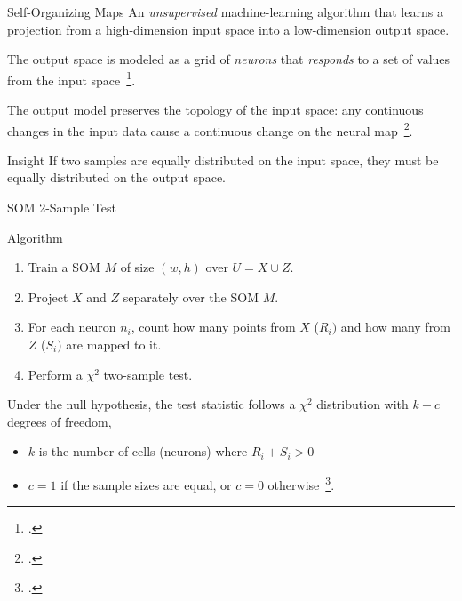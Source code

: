 \documentclass[10pt]{beamer}
\begin{document}
\begin{frame}{Self-Organizing Maps}
    An \emph{unsupervised} machine-learning algorithm that learns
    a projection from a high-dimension input space into a low-dimension output space.

    \smallskip
    
    The output space is modeled as a grid of \emph{neurons} that \emph{responds} to a set of
    values from the input space~\footcite{kohonen1982self}.

    \smallskip
    
    \alert{The output model preserves the topology of the input space}: any continuous changes
    in the input data cause a continuous change on the neural map~\footcite{Villmann1999}.
    
    \begin{alertblock}{Insight}
        \smallskip
        If two samples are equally distributed on the input space, they must be equally distributed on the output space.
    \end{alertblock}    

\end{frame}


\begin{frame}{SOM 2-Sample Test}
    \begin{block}{Algorithm}
        \begin{enumerate}
        \item Train a SOM $M$ of size $(w, h)$ over $U = X \cup Z$.
        \item Project $X$ and $Z$ separately over the SOM  $M$.
        \item For each neuron $n_i$, count how many points from $X$ ($R_i)$ and how many from $Z$ ($S_i)$ are mapped to it.
        \item Perform a $\chi^2$ two-sample test.
        \end{enumerate}

        Under the null hypothesis, the test statistic follows a $\chi^2$ distribution with $k - c$ degrees of freedom,
        \begin{itemize}
            \item $k$ is the number of cells (neurons) where ${R_i + S_i > 0}$
            \item $c = 1$ if the sample sizes are equal, or $c = 0$ otherwise~\footcite{press1993numerical}.
        \end{itemize}        
    \end{block}
\end{frame}
\end{document}
